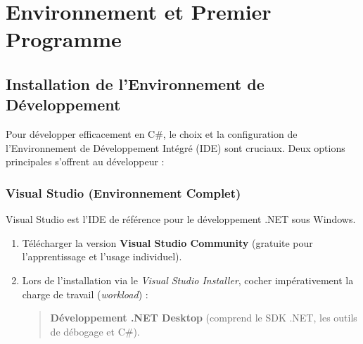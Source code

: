 
\section{Environnement et Premier Programme}

\subsection{Installation de l'Environnement de Développement}

Pour développer efficacement en C\#, le choix et la configuration de l'Environnement de Développement Intégré (IDE) sont cruciaux. Deux options principales s'offrent au développeur :

\subsubsection{Visual Studio (Environnement Complet)}
Visual Studio est l'IDE de référence pour le développement .NET sous Windows.
\begin{enumerate}
    \item Télécharger la version \textbf{Visual Studio Community} (gratuite pour l'apprentissage et l'usage individuel).
    \item Lors de l'installation via le \emph{Visual Studio Installer}, cocher impérativement la charge de travail (\emph{workload}) :
    \begin{quote}
        \textbf{Développement .NET Desktop} (comprend le SDK .NET, les outils de débogage et C\#).
    \end{quote}
\end{enumerate}

